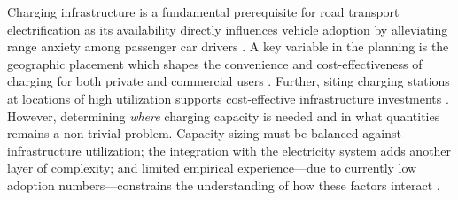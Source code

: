 Charging infrastructure is a fundamental prerequisite for road transport electrification as its availability directly influences vehicle adoption by alleviating range anxiety among passenger car drivers \cite{RAINIERI202352}. A key variable in the planning is the geographic placement which shapes the convenience and cost-effectiveness of charging for both private and commercial users \cite{HOPKINS2023113398}. Further, siting charging stations at locations of high utilization supports cost-effective infrastructure investments \cite{DU2024131374}. However, determining \textit{where} charging capacity is needed and in what quantities remains a non-trivial problem. Capacity sizing must be balanced against infrastructure utilization; the integration with the electricity system adds another layer of complexity; and limited empirical experience—due to currently low adoption numbers—constrains the understanding of how these factors interact \cite{YE2024105908}.

